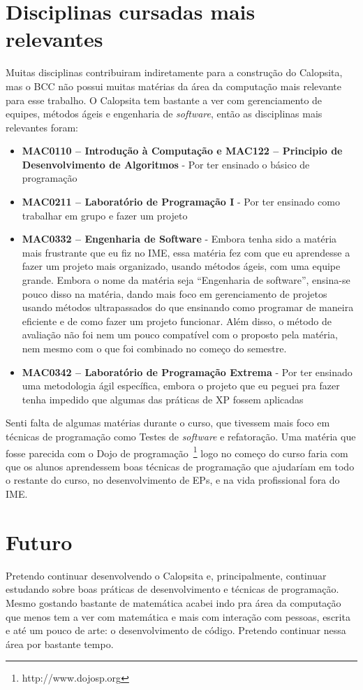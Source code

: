 \documentclass[titlepage,a4paper]{article}
\newcommand{\software}{\textit{software}}
\newcommand{\calopsita}{Calopsita}
\begin{document}
\section{Disciplinas cursadas mais relevantes}

Muitas disciplinas contribuiram indiretamente para a construção do \calopsita{}, mas o BCC não possui muitas matérias da área da computação mais relevante para esse trabalho. O \calopsita{} tem bastante a ver com gerenciamento de equipes, métodos ágeis e engenharia de \software{}, então as disciplinas mais relevantes foram:

\begin{itemize}
	\item{\textbf{MAC0110 -- Introdução à Computação e MAC122 -- Principio de Desenvolvimento de Algoritmos} - Por ter ensinado o básico de programação}
	\item{\textbf{MAC0211 -- Laboratório de Programação I} - Por ter ensinado como trabalhar em grupo e fazer um projeto}
	\item{\textbf{MAC0332 -- Engenharia de Software} - Embora tenha sido a matéria mais frustrante que eu fiz no IME, essa matéria fez com que eu aprendesse a fazer um projeto mais organizado, usando métodos ágeis, com uma equipe grande. Embora o nome da matéria seja ``Engenharia de software'', ensina-se pouco disso na matéria, dando mais foco em gerenciamento de projetos usando métodos ultrapassados do que ensinando como programar de maneira eficiente e de como fazer um projeto funcionar. Além disso, o método de avaliação não foi nem um pouco compatível com o proposto pela matéria, nem mesmo com o que foi combinado no começo do semestre.}
	\item{\textbf{MAC0342 -- Laboratório de Programação Extrema } - Por ter ensinado uma metodologia ágil específica, embora o projeto que eu peguei pra fazer tenha impedido que algumas das práticas de XP fossem aplicadas}
\end{itemize}

Senti falta de algumas matérias durante o curso, que tivessem mais foco em técnicas de programação como Testes de \software{} e refatoração. Uma matéria que fosse parecida com o Dojo de programação~\footnote{http://www.dojosp.org} logo no começo do curso faria com que os alunos aprendessem boas técnicas de programação que ajudaríam em todo o restante do curso, no desenvolvimento de EPs, e na vida profissional fora do IME.

\section{Futuro}

Pretendo continuar desenvolvendo o \calopsita{} e, principalmente, continuar estudando sobre boas práticas de desenvolvimento e técnicas de programação. Mesmo gostando bastante de matemática acabei indo pra área da computação que menos tem a ver com matemática e mais com interação com pessoas, escrita e até um pouco de arte: o desenvolvimento de código. Pretendo continuar nessa área por bastante tempo.
\end{document}
